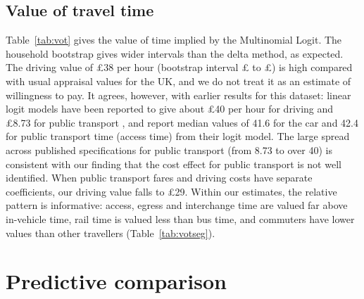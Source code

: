 \documentclass[11pt,a4paper]{article}
\newcommand{\gbp}{\pounds}
\newcommand{\tabpath}{tables/}
\begin{document}
\subsection{Value of travel time}
\label{sec:vot}
Table~\ref{tab:vot} gives the value of time implied by the Multinomial Logit. The household bootstrap gives wider intervals than the delta method, as expected. The driving value of \gbp{}38 per hour (bootstrap interval \gbp{}\bootCarLo{} to \gbp{}\bootCarHi{}) is high compared with usual appraisal values for the UK, and we do not treat it as an estimate of willingness to pay. It agrees, however, with earlier results for this dataset: linear logit models have been reported to give about \gbp{}40 per hour for driving and \gbp{}8.73 for public transport \citep[as cited by][]{salvade2024}, and \citet{martinbaos2023} report median values of 41.6 for the car and 42.4 for public transport time (access time) from their logit model. The large spread across published specifications for public transport (from 8.73 to over 40) is consistent with our finding that the cost effect for public transport is not well identified. When public transport fares and driving costs have separate coefficients, our driving value falls to \gbp{}29. Within our estimates, the relative pattern is informative: access, egress and interchange time are valued far above in-vehicle time, rail time is valued less than bus time, and commuters have lower values than other travellers (Table~\ref{tab:votseg}).

\begin{table}[H]
\centering\small

\caption{Value of time implied by the Multinomial Logit (training years): point estimate, delta-method interval, and household-bootstrap interval (\bootN{} refits).}
\label{tab:vot}
\end{table}

\begin{table}[H]
\centering\small

\caption{Value of time (\gbp{} per hour) by subsample, from separate refits of the selected specification. These point estimates are not accompanied by bootstrap intervals, and the delta-method intervals ignore clustering, so differences between columns should be read as indicative. Households without a car are omitted because the car cost coefficient is not identified there.}
\label{tab:votseg}
\end{table}

\section{Predictive comparison}
\label{sec:pred}
\end{document}
